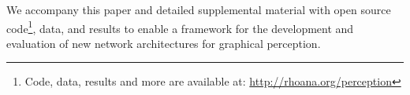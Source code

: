 We accompany this paper and detailed supplemental material with open source code\footnote{Code, data, results and more are available at: \url{http://rhoana.org/perception}}, data, and results to enable a framework for the development and evaluation of new network architectures for graphical perception.


%
%
%
%
%
%
%

